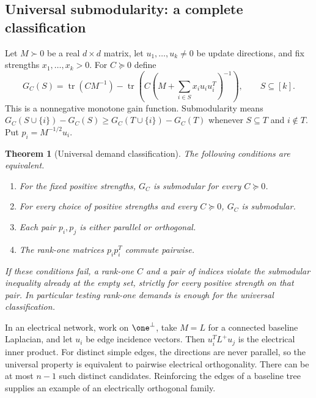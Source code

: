\documentclass[11pt,a4paper]{article}
\newtheorem{theorem}{Theorem}[section]
\theoremstyle{definition}\newtheorem{definition}[theorem]{Definition}
\theoremstyle{remark}\newtheorem{remark}[theorem]{Remark}
\DeclareMathOperator{\tr}{tr}\DeclareMathOperator{\supp}{supp}\DeclareMathOperator{\TV}{TV}
\numberwithin{equation}{section}
\begin{document}
\subsection{Universal submodularity: a complete classification}\label{T08-sec-1}
Let $M\succ0$ be a real $d\times d$ matrix, let $u_1,\ldots,u_k\ne0$ be update directions, and fix strengths $x_1,\ldots,x_k>0$. For $C\succeq0$ define
\[
 G_C(S)=\tr(CM^{-1})-\tr\left(C\left(M+\sum_{i\in S}x_i u_i u_i^T\right)^{-1}\right),\qquad S\subseteq[k].
\]
This is a nonnegative monotone gain function. Submodularity means
$G_C(S\cup\{i\})-G_C(S)\ge G_C(T\cup\{i\})-G_C(T)$ whenever $S\subseteq T$ and $i\notin T$.
Put $p_i=M^{-1/2}u_i$.
\begin{theorem}[Universal demand classification]\label{T08-main}
The following conditions are equivalent.
\begin{enumerate}
\item For the fixed positive strengths, $G_C$ is submodular for every $C\succeq0$.
\item For every choice of positive strengths and every $C\succeq0$, $G_C$ is submodular.
\item Each pair $p_i,p_j$ is either parallel or orthogonal.
\item The rank-one matrices $p_i p_i^T$ commute pairwise.
\end{enumerate}
If these conditions fail, a rank-one $C$ and a pair of indices violate the submodular inequality already at the empty set, strictly for every positive strength on that pair. In particular testing rank-one demands is enough for the universal classification.
\end{theorem}
In an electrical network, work on $\one^\perp$, take $M=L$ for a connected baseline Laplacian, and let $u_i$ be edge incidence vectors. Then $u_i^TL^+u_j$ is the electrical inner product. For distinct simple edges, the directions are never parallel, so the universal property is equivalent to pairwise electrical orthogonality. There can be at most $n-1$ such distinct candidates. Reinforcing the edges of a baseline tree supplies an example of an electrically orthogonal family.
\end{document}
